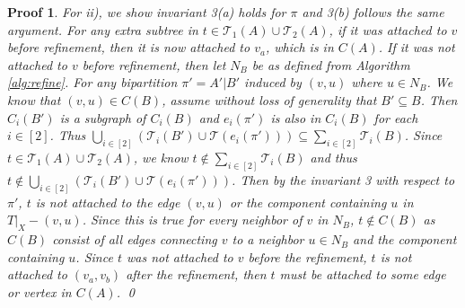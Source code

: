 \documentclass[twocolumn]{bmcart}%
\theoremstyle{mystyle}
\theoremstyle{proofstyle}
\newtheorem*{proof2}{Proof}
\newenvironment{proofnospace}{\begin{proof2}}{\qed \end{proof2}}
\begin{document}
\begin{proofnospace}
    For ii), we show invariant 3(a) holds for $\pi$ and 3(b) follows the same argument. For any extra subtree in $t \in \mathcal{T}_1(A)\cup \mathcal{T}_2(A)$, if it was attached to $v$ before refinement, then it is now attached to $v_a$, which is in $C(A)$. If it was not attached to $v$ before refinement, then let $N_B$ be as defined from Algorithm \ref{alg:refine}. For any bipartition $\pi'= A'|B'$ induced by $(v,u)$ where $u \in N_B$. We know that $(v,u) \in C(B)$, assume without loss of generality that $B'\subseteq B$. Then $C_i(B')$ is a subgraph of $C_i(B)$ and $e_i(\pi')$ is also in $C_i(B)$ for each $i \in [2]$. Thus $\bigcup_{i\in[2]} (\mathcal{T}_i(B') \cup \mathcal{T}(e_i(\pi'))) \subseteq \sum_{i\in[2]}\mathcal{T}_i(B)$. Since $t \in \mathcal{T}_1(A)\cup \mathcal{T}_2(A)$, we know $t \notin \sum_{i\in[2]}\mathcal{T}_i(B)$ and thus $t \notin \bigcup_{i\in[2]} (\mathcal{T}_i(B') \cup \mathcal{T}(e_i(\pi')))$. Then by the invariant 3 with respect to $\pi'$, $t$ is not attached to the edge $(v,u)$ or the component containing $u$ in $T|_X - (v,u)$. Since this is true for every neighbor of $v$ in $N_B$, $t \notin C(B)$ as $C(B)$ consist of all edges connecting $v$ to a neighbor $u\in N_B$ and the component containing $u$. Since $t$ was not attached to $v$ before the refinement, $t$ is not attached to $(v_a,v_b)$ after the refinement, then $t$ must be attached to some edge or vertex in $C(A)$.
\end{proofnospace}
\end{document}
